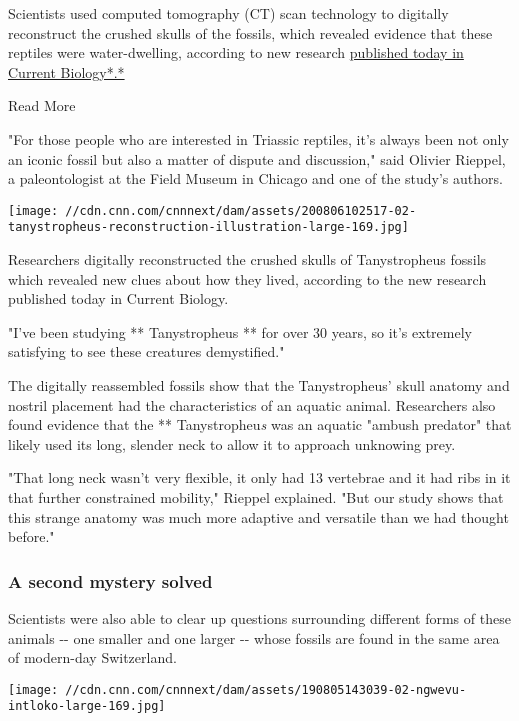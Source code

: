 Scientists used computed tomography (CT) scan technology to digitally
reconstruct the crushed skulls of the fossils, which revealed evidence
that these reptiles were water-dwelling, according to new research
\href{https://www.cell.com/current-biology/fullt}{published today in
Current Biology*.*}

Read More

"For those people who are interested in Triassic reptiles, it's always
been not only an iconic fossil but also a matter of dispute and
discussion," said Olivier Rieppel, a paleontologist at the Field Museum
in Chicago and one of the study's authors.

\texttt{[image: //cdn.cnn.com/cnnnext/dam/assets/200806102517-02-tanystropheus-reconstruction-illustration-large-169.jpg]}

Researchers digitally reconstructed the crushed skulls of Tanystropheus
fossils which revealed new clues about how they lived, according to the
new research published today in Current Biology.

"I've been studying ** Tanystropheus ** for over 30 years, so it's
extremely satisfying to see these creatures demystified."

The digitally reassembled fossils show that the Tanystropheus' skull
anatomy and nostril placement had the characteristics of an aquatic
animal. Researchers also found evidence that the ** Tanystropheu\emph{s}
was an aquatic "ambush predator" that likely used its long, slender neck
to allow it to approach unknowing prey.

"That long neck wasn't very flexible, it only had 13 vertebrae and it
had ribs in it that further constrained mobility," Rieppel explained.
"But our study shows that this strange anatomy was much more adaptive
and versatile than we had thought before."

\hypertarget{a-second-mystery-solved}{%
\subsubsection{A second mystery solved}\label{a-second-mystery-solved}}

Scientists were also able to clear up questions surrounding different
forms of these animals -\/- one smaller and one larger -\/- whose
fossils are found in the same area of modern-day Switzerland.

\href{/travel/article/new-dinosaur-intl-scli-gbr-scn/index.html}{}

\texttt{[image: //cdn.cnn.com/cnnnext/dam/assets/190805143039-02-ngwevu-intloko-large-169.jpg]}

